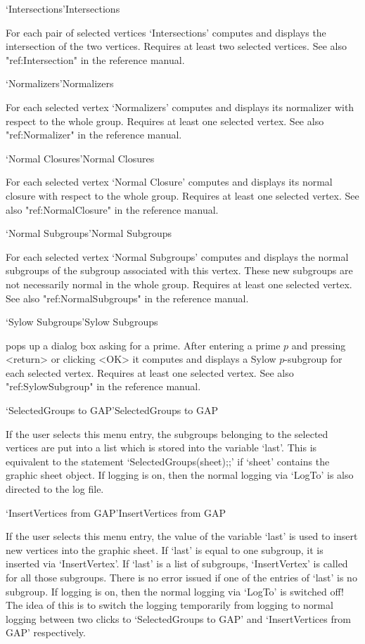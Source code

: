 \>`Intersections'{Intersections}

For each pair of selected vertices `Intersections' computes and displays
the intersection of the two vertices.  Requires at least two selected
vertices.  See also "ref:Intersection" in the {\GAP}
reference manual.

\>`Normalizers'{Normalizers}

For each selected vertex `Normalizers' computes and displays its normalizer
with respect to the whole group.  Requires at least one selected vertex.
See also "ref:Normalizer" in the {\GAP}
reference manual.

\>`Normal Closures'{Normal Closures}

For each selected vertex `Normal Closure' computes and displays its normal
closure with respect to the whole group.  Requires at least one selected
vertex.  See also "ref:NormalClosure" in the {\GAP}
reference manual.

\>`Normal Subgroups'{Normal Subgroups}

For   each selected vertex `Normal  Subgroups'  computes and displays the
normal subgroups of the subgroup associated  with this vertex.  These new
subgroups are not  necessarily  normal in the  whole  group.  Requires at
least one selected vertex.  See also "ref:NormalSubgroups" in the {\GAP}
reference manual.

\>`Sylow Subgroups'{Sylow Subgroups}

pops  up a dialog  box asking   for a prime.   After entering  a  prime $p$ 
and pressing  <return> or  clicking  <OK> it computes   and displays  a Sylow
$p$-subgroup  for   each selected vertex.  Requires   at   least one selected
vertex.  See also "ref:SylowSubgroup" in the {\GAP}
reference manual.

\>`SelectedGroups to GAP'{SelectedGroups to GAP}

If  the  user  selects  this menu entry,  the  subgroups   belonging to the
selected  vertices are put into a  list which  is  stored into the variable
`last'.  This is equivalent  to the  statement `SelectedGroups(sheet);;' if
`sheet' contains the graphic sheet  object. If {\XGAP}  logging is on, then
the normal {\GAP} logging via `LogTo'  is also directed  to the {\XGAP} log
file.

\>`InsertVertices from GAP'{InsertVertices from GAP}

If the user selects this  menu entry, the  value of the variable `last'  is
used to insert new vertices into the graphic sheet.  If  `last' is equal to
one subgroup, it  is inserted via  `InsertVertex'. If `last'  is a list  of
subgroups, `InsertVertex' is  called for all  those subgroups. There is  no
error  issued if one of  the entries of `last'   is no subgroup. If {\XGAP}
logging is on, then the normal {\GAP} logging via `LogTo'  is switched off! 
The idea of this is to switch  the logging temporarily from {\XGAP} logging
to normal  {\GAP} logging between two clicks  to  `SelectedGroups to GAP'
and `InsertVertices from GAP' respectively.

